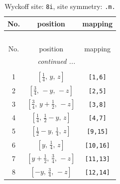\documentclass[fleqn,8pt]{jsarticle}
\begin{document}
\begin{longtable}{ccc}
\caption{Wyckoff site: {\tt 8i}, site symmetry: {\tt .m.}}
 \\
 \hline \hline
No. & position & mapping \\ \hline \endfirsthead

\multicolumn{2}{l}{\tablename\ \thetable{}} \\
 \hline \hline
No. & position & mapping \\ \hline \endhead

 \hline \hline
\multicolumn{2}{r}{\footnotesize\it continued ...} \\ \endfoot

 \hline \hline
\multicolumn{2}{r}{} \\ \endlastfoot

1 & $\left[ \frac{1}{4},\, y,\, z \right]$ & {\tt [1,6]} \\ \hline
2 & $\left[ \frac{3}{4},\, - y,\, - z \right]$ & {\tt [2,5]} \\ \hline
3 & $\left[ \frac{3}{4},\, y + \frac{1}{2},\, - z \right]$ & {\tt [3,8]} \\ \hline
4 & $\left[ \frac{1}{4},\, \frac{1}{2} - y,\, z \right]$ & {\tt [4,7]} \\ \hline
5 & $\left[ \frac{1}{2} - y,\, \frac{1}{4},\, z \right]$ & {\tt [9,15]} \\ \hline
6 & $\left[ y,\, \frac{1}{4},\, z \right]$ & {\tt [10,16]} \\ \hline
7 & $\left[ y + \frac{1}{2},\, \frac{3}{4},\, - z \right]$ & {\tt [11,13]} \\ \hline
8 & $\left[ - y,\, \frac{3}{4},\, - z \right]$ & {\tt [12,14]} \\
\end{longtable}
\renewcommand{\arraystretch}{1.2}
\end{document}
